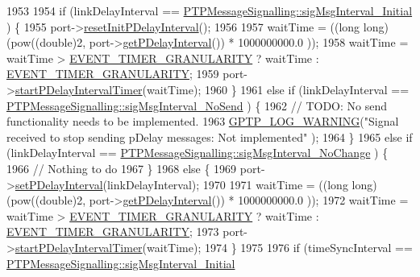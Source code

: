 \begin{DoxyCode}
{{{1953 
1954     \textcolor{keywordflow}{if} (linkDelayInterval == \hyperlink{class_p_t_p_message_signalling_aa46796faa0e40d6a5c22d0c2ba50d991}{PTPMessageSignalling::sigMsgInterval\_Initial}
      ) \{
1955         port->\hyperlink{class_common_port_a581ecd601f511bc0e7378f12ff690c63}{resetInitPDelayInterval}();
1956 
1957         waitTime = ((\textcolor{keywordtype}{long} long) (pow((\textcolor{keywordtype}{double})2, port->\hyperlink{class_common_port_a6b594b958b0887ec332bfb61bc5981c4}{getPDelayInterval}()) *  1000000000.0
      ));
1958         waitTime = waitTime > \hyperlink{avbts__clock_8hpp_a9fc7849128814495c7dccd06d5343baa}{EVENT\_TIMER\_GRANULARITY} ? waitTime : 
      \hyperlink{avbts__clock_8hpp_a9fc7849128814495c7dccd06d5343baa}{EVENT\_TIMER\_GRANULARITY};
1959         port->\hyperlink{class_common_port_a6fb0ad2d83f335ad766394adfd52e930}{startPDelayIntervalTimer}(waitTime);
1960     \}
1961     \textcolor{keywordflow}{else} \textcolor{keywordflow}{if} (linkDelayInterval == \hyperlink{class_p_t_p_message_signalling_afcb2a19f3190abbb589f24267c8cd636}{PTPMessageSignalling::sigMsgInterval\_NoSend}
      ) \{
1962         \textcolor{comment}{// TODO: No send functionality needs to be implemented.}
1963         \hyperlink{gptp__log_8hpp_af167ce4fe92c399b212449dfb071a3f5}{GPTP\_LOG\_WARNING}(\textcolor{stringliteral}{"Signal received to stop sending pDelay messages: Not implemented"}
      );
1964     \}
1965     \textcolor{keywordflow}{else} \textcolor{keywordflow}{if} (linkDelayInterval == \hyperlink{class_p_t_p_message_signalling_af6d2439496842acecd33cf27e79e8a04}{PTPMessageSignalling::sigMsgInterval\_NoChange}
      ) \{
1966         \textcolor{comment}{// Nothing to do}
1967     \}
1968     \textcolor{keywordflow}{else} \{
1969         port->\hyperlink{class_common_port_aeccea93c15d4e8ce00dd87a20227a8bb}{setPDelayInterval}(linkDelayInterval);
1970 
1971         waitTime = ((\textcolor{keywordtype}{long} long) (pow((\textcolor{keywordtype}{double})2, port->\hyperlink{class_common_port_a6b594b958b0887ec332bfb61bc5981c4}{getPDelayInterval}()) *  1000000000.0
      ));
1972         waitTime = waitTime > \hyperlink{avbts__clock_8hpp_a9fc7849128814495c7dccd06d5343baa}{EVENT\_TIMER\_GRANULARITY} ? waitTime : 
      \hyperlink{avbts__clock_8hpp_a9fc7849128814495c7dccd06d5343baa}{EVENT\_TIMER\_GRANULARITY};
1973         port->\hyperlink{class_common_port_a6fb0ad2d83f335ad766394adfd52e930}{startPDelayIntervalTimer}(waitTime);
1974     \}
1975 
1976     \textcolor{keywordflow}{if} (timeSyncInterval == \hyperlink{class_p_t_p_message_signalling_aa46796faa0e40d6a5c22d0c2ba50d991}{PTPMessageSignalling::sigMsgInterval\_Initial}
}}}
\end{DoxyCode}

